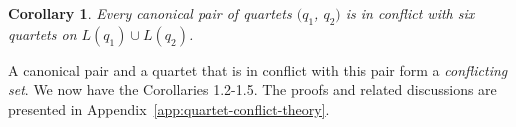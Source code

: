 \documentclass[10pt,a4paper]{article}
\newcommand{\add}[1]{{\color{blue} #1}}
\newtheorem{corollary}{Corollary}[theorem]
\begin{document}

\begin{corollary}
\label{cor:six_conflict}
Every canonical pair of quartets $(q_1$, $q_2)$ is in conflict with six quartets on $L(q_1) \cup L(q_2)$.
\end{corollary}

A canonical pair and a quartet that is in conflict with this pair form a \textit{conflicting set}. We now have the Corollaries 1.2-1.5. %
The proofs and related discussions are presented in Appendix~\ref{app:quartet-conflict-theory}.

\end{document}
